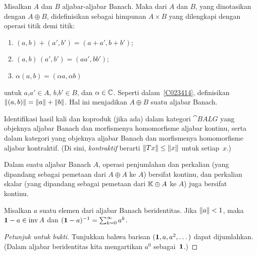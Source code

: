 \begin{prop} Misalkan $A$ dan $B$ aljabar-aljabar Banach. Maka
 dari $A$ dan $B$, yang dinotasikan dengan $A \oplus B$, didefinisikan sebagai himpunan $A
\times B$ yang dilengkapi dengan operasi titik demi titik:
   \begin{enumerate}[label=\rm{(\alph*)}]
     \item $(a,b) + (a',b') = (a + a',b + b')$;
     \item $(a,b)\,(a',b') = (aa',bb')$;
     \item $\alpha(a,b) = (\alpha a,\alpha b)$
   \end{enumerate}
untuk $a$,$a' \in A$, $b$,$b' \in B$, dan $\alpha \in \mathbb{C}$. Seperti dalam~\ref{C023414}, definisikan
$\lVert(a,b)\rVert = \lVert a\rVert + \lVert b\rVert$. Hal ini menjadikan $A \oplus B$ suatu aljabar Banach.
\end{prop}

\begin{exer} Identifikasi hasil kali dan koproduk (jika ada) dalam kategori $\cat{BALG}$
yang objeknya aljabar Banach
dan morfismenya homomorfisme aljabar kontinu, serta dalam kategori yang objeknya aljabar Banach dan
morfismenya homomorfisme aljabar kontraktif. (Di sini,
\emph{kontraktif} berarti $\lVert Tx\rVert \le \lVert x\rVert$ untuk setiap~$x$.)
\end{exer}

\begin{prop} Dalam suatu aljabar Banach $A$, operasi penjumlahan dan perkalian (yang dipandang sebagai
pemetaan dari $A \oplus A$ ke $A$) bersifat kontinu, dan perkalian skalar (yang dipandang sebagai pemetaan dari
$\mathbb{K} \oplus A$ ke $A$) juga bersifat kontinu.
\end{prop}

\begin{prop}\label{prop_Neumann_series} Misalkan $a$ suatu elemen dari aljabar Banach beridentitas.
Jika $\lVert a\rVert < 1$, maka
$\mathbf{1} - a \in \operatorname{inv} A$ dan $(\mathbf{1} - a)^{-1} = \sum_{k=0}^\infty a^k$.
\end{prop}

\begin{proof}[\emph{Petunjuk untuk bukti}] Tunjukkan bahwa barisan $(\mathbf{1}, a, a^2, \dots)$
dapat dijumlahkan. (Dalam aljabar beridentitas kita mengartikan $a^0$ sebagai~$\mathbf{1}$.)  \ns
\end{proof}

